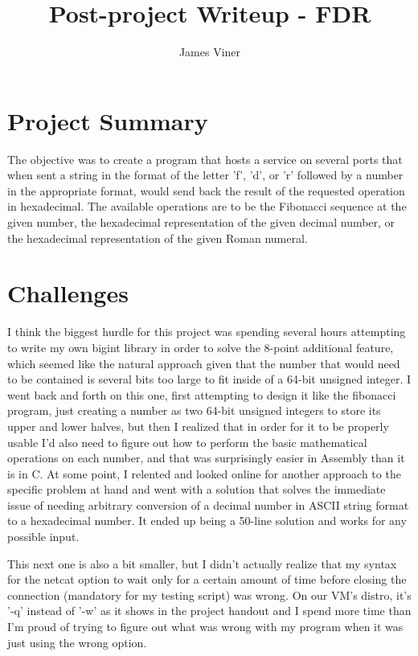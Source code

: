 \documentclass[11pt]{report}
\begin{document}
\title{Post-project Writeup - FDR}
\author{James Viner}
\date{} %

\maketitle

\doublespacing

\section*{Project Summary}
The objective was to create a program that hosts a service on several ports that when sent a string in the format of the letter 'f', 'd', or 'r' followed by a number in the appropriate format, would send back the result of the requested operation in hexadecimal. The available operations are to be the Fibonacci sequence at the given number, the hexadecimal representation of the given decimal number, or the hexadecimal representation of the given Roman numeral.
\section*{Challenges}
I think the biggest hurdle for this project was spending several hours attempting to write my own bigint library in order to solve the 8-point additional feature, which seemed like the natural approach given that the number that would need to be contained is several bits too large to fit inside of a 64-bit unsigned integer. I went back and forth on this one, first attempting to design it like the fibonacci program, just creating a number as two 64-bit unsigned integers to store its upper and lower halves, but then I realized that in order for it to be properly usable I'd also need to figure out how to perform the basic mathematical operations on each number, and that was surprisingly easier in Assembly than it is in C. At some point, I relented and looked online for another approach to the specific problem at hand and went with a solution that solves the immediate issue of needing arbitrary conversion of a decimal number in ASCII string format to a hexadecimal number. It ended up being a 50-line solution and works for any possible input.

This next one is also a bit smaller, but I didn't actually realize that my syntax for the netcat option to wait only for a certain amount of time before closing the connection (mandatory for my testing script) was wrong. On our VM's distro, it's '-q' instead of '-w' as it shows in the project handout and I spend more time than I'm proud of trying to figure out what was wrong with my program when it was just using the wrong option.
\end{document}
